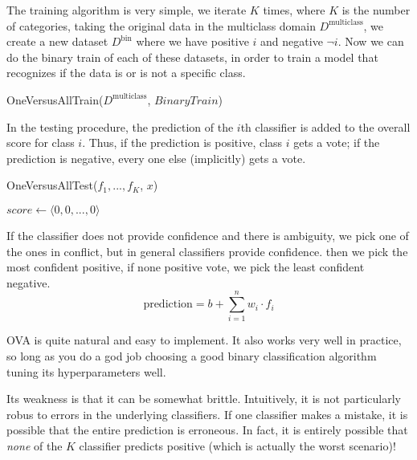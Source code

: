 The training algorithm is very simple, we iterate \(K\) times, where \(K\) is the number of categories, taking the original data in the multiclass domain \(D^\text{multiclass}\), we create a new dataset \(D^\text{bin}\) where we have positive \(i\) and negative \(\neg i\). Now we can do the binary train of each of these datasets, in order to train a model that recognizes if the data is or is not a specific class. 

\begin{algorithm}
\caption{OneVersusAllTrain($D^\text{multiclass}$, $BinaryTrain$)}
\label{alg:ovatrain}
\end{algorithm}

In the testing procedure, the prediction of the \(i\)th classifier is added to the overall score for class \(i\). Thus, if the prediction is positive, class \(i\) gets a vote; if the prediction is negative, every one else (implicitly) gets a vote.

\begin{algorithm}
\caption{OneVersusAllTest($f_1,...,f_K$, $x$)}
\label{alg:ovatest}
$score \gets \langle 0,0,...,0 \rangle$\;
\end{algorithm}

If the classifier does not provide confidence and there is ambiguity, we pick one of the ones in conflict, but in general classifiers provide confidence. then we pick the most confident positive, if none positive vote, we pick the least confident negative.
\begin{equation}
	\text{prediction} = b + \sum_{i=1}^n w_i \cdot f_i
\end{equation}

OVA is quite natural and easy to implement. It also works very well in practice, so long as you do a god job choosing a good binary classification algorithm tuning its hyperparameters well.

Its weakness is that it can be somewhat brittle. Intuitively, it is not particularly robus to errors in the underlying classifiers. If one classifier makes a mistake, it is possible that the entire prediction is erroneous. In fact, it is entirely possible that \emph{none} of the \(K\) classifier predicts positive (which is actually the worst scenario)!

